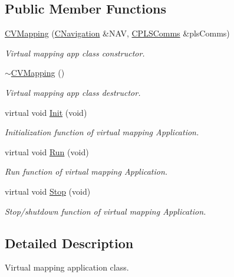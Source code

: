 \subsection*{Public Member Functions}
\begin{DoxyCompactItemize}
\item 
\mbox{\hyperlink{class_c_v_mapping_af6ee17cb269e87c9da52a22ef29b50df}{C\+V\+Mapping}} (\mbox{\hyperlink{class_c_navigation}{C\+Navigation}} \&N\+AV, \mbox{\hyperlink{class_c_p_l_s_comms}{C\+P\+L\+S\+Comms}} \&pls\+Comms)
\begin{DoxyCompactList}\small\item\em Virtual mapping app class constructor. \end{DoxyCompactList}\item 
\mbox{\hyperlink{class_c_v_mapping_af597f7af00322fe01ec8f74838b06f08}{$\sim$\+C\+V\+Mapping}} ()
\begin{DoxyCompactList}\small\item\em Virtual mapping app class destructor. \end{DoxyCompactList}\item 
virtual void \mbox{\hyperlink{class_c_v_mapping_a110257122b8946bcb8f17051070e03eb}{Init}} (void)
\begin{DoxyCompactList}\small\item\em Initialization function of virtual mapping Application. \end{DoxyCompactList}\item 
virtual void \mbox{\hyperlink{class_c_v_mapping_a8f064fcfd01953d7072efd5de23f89ef}{Run}} (void)
\begin{DoxyCompactList}\small\item\em Run function of virtual mapping Application. \end{DoxyCompactList}\item 
virtual void \mbox{\hyperlink{class_c_v_mapping_ad4e34f79b444109d0cbf1223881126dc}{Stop}} (void)
\begin{DoxyCompactList}\small\item\em Stop/shutdown function of virtual mapping Application. \end{DoxyCompactList}\end{DoxyCompactItemize}


\subsection{Detailed Description}
Virtual mapping application class. 

